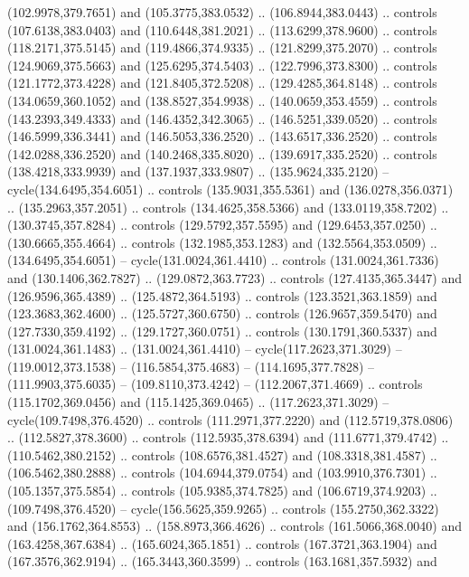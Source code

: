 \begin{scope}[cm={{1.25,0.0,0.0,-1.25,(0.0,743.43331)}}]
    (102.9978,379.7651) and (105.3775,383.0532) .. (106.8944,383.0443) .. controls
    (107.6138,383.0403) and (110.6448,381.2021) .. (113.6299,378.9600) .. controls
    (118.2171,375.5145) and (119.4866,374.9335) .. (121.8299,375.2070) .. controls
    (124.9069,375.5663) and (125.6295,374.5403) .. (122.7996,373.8300) .. controls
    (121.1772,373.4228) and (121.8405,372.5208) .. (129.4285,364.8148) .. controls
    (134.0659,360.1052) and (138.8527,354.9938) .. (140.0659,353.4559) .. controls
    (143.2393,349.4333) and (146.4352,342.3065) .. (146.5251,339.0520) .. controls
    (146.5999,336.3441) and (146.5053,336.2520) .. (143.6517,336.2520) .. controls
    (142.0288,336.2520) and (140.2468,335.8020) .. (139.6917,335.2520) .. controls
    (138.4218,333.9939) and (137.1937,333.9807) .. (135.9624,335.2120) --
    cycle(134.6495,354.6051) .. controls (135.9031,355.5361) and
    (136.0278,356.0371) .. (135.2963,357.2051) .. controls (134.4625,358.5366) and
    (133.0119,358.7202) .. (130.3745,357.8284) .. controls (129.5792,357.5595) and
    (129.6453,357.0250) .. (130.6665,355.4664) .. controls (132.1985,353.1283) and
    (132.5564,353.0509) .. (134.6495,354.6051) -- cycle(131.0024,361.4410) ..
    controls (131.0024,361.7336) and (130.1406,362.7827) .. (129.0872,363.7723) ..
    controls (127.4135,365.3447) and (126.9596,365.4389) .. (125.4872,364.5193) ..
    controls (123.3521,363.1859) and (123.3683,362.4600) .. (125.5727,360.6750) ..
    controls (126.9657,359.5470) and (127.7330,359.4192) .. (129.1727,360.0751) ..
    controls (130.1791,360.5337) and (131.0024,361.1483) .. (131.0024,361.4410) --
    cycle(117.2623,371.3029) -- (119.0012,373.1538) -- (116.5854,375.4683) --
    (114.1695,377.7828) -- (111.9903,375.6035) -- (109.8110,373.4242) --
    (112.2067,371.4669) .. controls (115.1702,369.0456) and (115.1425,369.0465) ..
    (117.2623,371.3029) -- cycle(109.7498,376.4520) .. controls
    (111.2971,377.2220) and (112.5719,378.0806) .. (112.5827,378.3600) .. controls
    (112.5935,378.6394) and (111.6771,379.4742) .. (110.5462,380.2152) .. controls
    (108.6576,381.4527) and (108.3318,381.4587) .. (106.5462,380.2888) .. controls
    (104.6944,379.0754) and (103.9910,376.7301) .. (105.1357,375.5854) .. controls
    (105.9385,374.7825) and (106.6719,374.9203) .. (109.7498,376.4520) --
    cycle(156.5625,359.9265) .. controls (155.2750,362.3322) and
    (156.1762,364.8553) .. (158.8973,366.4626) .. controls (161.5066,368.0040) and
    (163.4258,367.6384) .. (165.6024,365.1851) .. controls (167.3721,363.1904) and
    (167.3576,362.9194) .. (165.3443,360.3599) .. controls (163.1681,357.5932) and

\end{scope}
